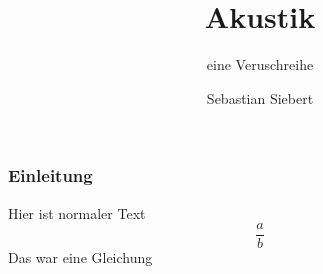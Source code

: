 \documentclass[11pt]{beamer}
\begin{document}
	\author{Sebastian Siebert}
	\title{Akustik}
	\subtitle{eine Veruschreihe}
	\frame[plain]{\maketitle}
	
	\begin{frame}
		\frametitle{Einleitung}
		Hier ist normaler Text\\
		\begin{equation}
		\frac{a}{b}
		\end{equation}
		Das war eine Gleichung
	\end{frame}
\end{document}
